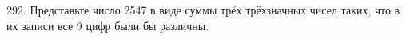 292. Представьте число 2547 в виде суммы трёх трёхзначных чисел таких, что в их записи все 9 цифр были бы различны.\\

